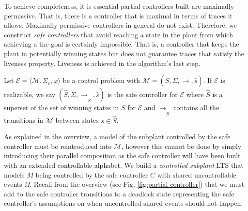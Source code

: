 To achieve completeness, it is essential partial controllers built are maximally permissive. That is, there is a controller that is maximal in terms of traces it allows. 
Maximally permissive controllers in general do not exist. 
Therefore, we construct \textit{{safe controllers}} that avoid reaching a state in the plant from which achieving a the goal is certainly impossible. That is, a controller that keeps the plant in potentially winning states
but does not guarantee traces that satisfy the liveness property.  Liveness is achieved in the algorithm's last step.

\begin{definition}
    \label{def:safe-controller}
    Let $\mathcal{E} = \langle \mathcal{M}, \Sigma_c, 
     \varphi \rangle$ be a control problem with $\mathcal{M} = (S, \Sigma, \xrightarrow[]{}, \hat{s})$.  If $\mathcal{E}$ is realizable, we say $(\hat{S}, \Sigma, \xrightarrow[]{}_S, \hat{s})$ is the {safe controller} for $\mathcal{E}$ where
  $\hat{S}$ is a superset of the set of winning states in $S$ for $\mathcal{E}$ and 
$\xrightarrow[]{}_S$ contains all the transitions in $\mathcal{M}$ between states $s \in \hat{S}$. 
\end{definition}

As explained in the overview, a model of the subplant controlled by the safe controller must be reintroduced into $\mathcal{M}$, however this cannot be done by simply introducing their parallel composition as the safe controller will have been built with an extended controllable alphabet. 
We build a \textit{controlled subplant} LTS that models $M$ being controlled by the safe controller $C$ with shared uncontrollable events $\Omega$. Recall from the overview (see Fig. \ref{fig:partial-controller}) that we must add to the safe controller transitions to a deadlock state representing the safe controller's assumptions on when uncontrolled shared events should not happen.  

